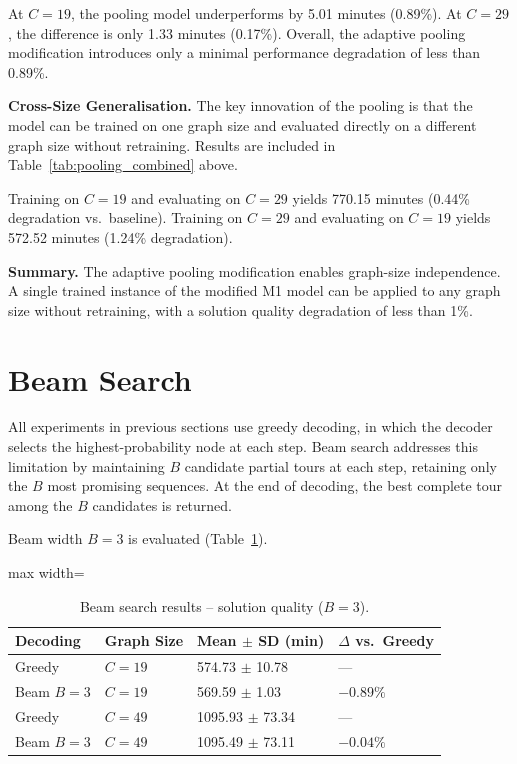 At $C = 19$, the pooling model underperforms by 5.01 minutes (0.89\%). At $C = 29$, the
difference is only 1.33 minutes (0.17\%). Overall, the adaptive pooling modification
introduces only a minimal performance degradation of less than 0.89\%.

\textbf{Cross-Size Generalisation.} The key innovation of the pooling is that the model can be trained on one graph size and
evaluated directly on a different graph size without retraining. Results are included in
Table~\ref{tab:pooling_combined} above.

Training on $C = 19$ and evaluating on $C = 29$ yields 770.15 minutes (0.44\% degradation
vs.\ baseline). Training on $C = 29$ and evaluating on $C = 19$ yields 572.52 minutes
(1.24\% degradation).

\textbf{Summary.} The adaptive pooling modification enables graph-size independence. A single trained instance
of the modified M1 model can be applied to any graph size without retraining, with a
solution quality degradation of less than 1\%.

\section{Beam Search}
\label{sec:beam_search}

All experiments in previous sections use greedy decoding, in which the decoder selects the
highest-probability node at each step. Beam search addresses this limitation by maintaining
$B$ candidate partial tours at each step, retaining only the $B$ most promising sequences.
At the end of decoding, the best complete tour among the $B$ candidates is returned.

Beam width $B = 3$ is evaluated (Table~\ref{tab:beam_search}).

\begin{table}[H]
\centering
\caption{Beam search results -- solution quality ($B = 3$).}
\label{tab:beam_search}
\begin{adjustbox}{max width=\textwidth}
\begin{tabular}{llll}
\toprule
\textbf{Decoding} & \textbf{Graph Size} & \textbf{Mean $\pm$ SD (min)}
    & \textbf{$\Delta$ vs.\ Greedy} \\
\midrule
Greedy     & $C = 19$ & 574.73 $\pm$ 10.78  & --- \\
Beam $B=3$ & $C = 19$ & 569.59 $\pm$ 1.03   & $-0.89\%$ \\
Greedy     & $C = 49$ & 1095.93 $\pm$ 73.34 & --- \\
Beam $B=3$ & $C = 49$ & 1095.49 $\pm$ 73.11 & $-0.04\%$ \\
\bottomrule
\end{tabular}
\end{adjustbox}
\end{table}

